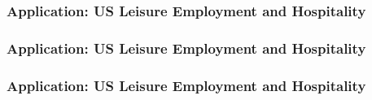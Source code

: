 \documentclass{beamer}
\begin{document}
\begin{frame}
  \frametitle{Application:  US Leisure Employment and Hospitality}
\end{frame}

\begin{frame}
  \frametitle{Application:  US Leisure Employment and Hospitality}
\end{frame}


\begin{frame}
  \frametitle{Application:  US Leisure Employment and Hospitality}
\end{frame}
\end{document}
